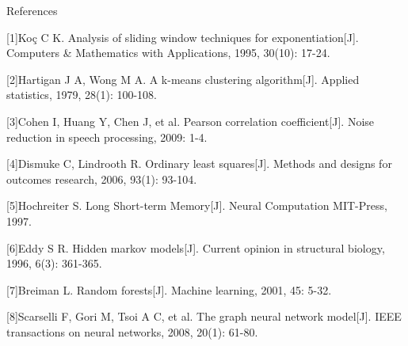 


\usepackage{newtxtext}	%
\usepackage[style=apa,backend=biber]{biblatex}	%

References

[1]Koç C K. Analysis of sliding window techniques for exponentiation[J]. Computers & Mathematics with Applications, 1995, 30(10): 17-24.

[2]Hartigan J A, Wong M A. A k-means clustering algorithm[J]. Applied statistics, 1979, 28(1): 100-108.

[3]Cohen I, Huang Y, Chen J, et al. Pearson correlation coefficient[J]. Noise reduction in speech processing, 2009: 1-4.

[4]Dismuke C, Lindrooth R. Ordinary least squares[J]. Methods and designs for outcomes research, 2006, 93(1): 93-104.

[5]Hochreiter S. Long Short-term Memory[J]. Neural Computation MIT-Press, 1997.

[6]Eddy S R. Hidden markov models[J]. Current opinion in structural biology, 1996, 6(3): 361-365.

[7]Breiman L. Random forests[J]. Machine learning, 2001, 45: 5-32.

[8]Scarselli F, Gori M, Tsoi A C, et al. The graph neural network model[J]. IEEE transactions on neural networks, 2008, 20(1): 61-80.

